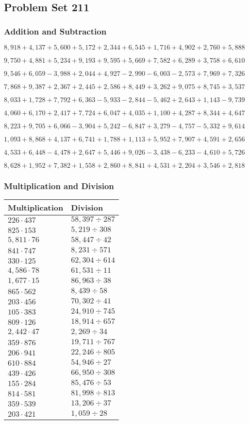 \hypertarget{problem-set-211}{%
\subsection{Problem Set 211}\label{problem-set-211}}

\hypertarget{addition-and-subtraction}{%
\subsubsection{Addition and
Subtraction}\label{addition-and-subtraction}}

\(8,918+4,137+5,600+5,172+2,344+6,545+1,716+4,902+2,760+5,888\)

\(9,750+4,881+5,234+9,193+9,595+5,669+7,582+6,289+3,758+6,610\)

\(9,546+6,059-3,988+2,044+4,927-2,990-6,003-2,573+7,969+7,326\)

\(7,868+9,387+2,367+2,445+2,586+8,449+3,262+9,075+8,745+3,537\)

\(8,033+1,728+7,792+6,363-5,933-2,844-5,462+2,643+1,143-9,739\)

\(4,060+6,170+2,417+7,724+6,047+4,035+1,100+4,287+8,344+4,647\)

\(8,223+9,705+6,066-3,904+5,242-6,847+3,279-4,757-5,332+9,614\)

\(1,093+8,868+4,137+6,741+1,788+1,113+5,952+7,907+4,591+2,656\)

\(4,533+6,448-4,478+2,647+5,446+9,026-3,438-6,233-4,610+5,726\)

\(8,628+1,952+7,382+1,558+2,860+8,841+4,531+2,204+3,546+2,818\)

\hypertarget{multiplication-and-division}{%
\subsubsection{Multiplication and
Division}\label{multiplication-and-division}}

\begin{longtable}[]{@{}ll@{}}
\toprule
Multiplication & Division\tabularnewline
\midrule
\endhead
\(226\cdot437\) & \(58,397÷287\)\tabularnewline
\(825\cdot153\) & \(5,219÷308\)\tabularnewline
\(5,811\cdot76\) & \(58,447÷42\)\tabularnewline
\(841\cdot747\) & \(8,231÷571\)\tabularnewline
\(330\cdot125\) & \(62,304÷614\)\tabularnewline
\(4,586\cdot78\) & \(61,531÷11\)\tabularnewline
\(1,677\cdot15\) & \(86,963÷38\)\tabularnewline
\(865\cdot562\) & \(8,439÷58\)\tabularnewline
\(203\cdot456\) & \(70,302÷41\)\tabularnewline
\(105\cdot383\) & \(24,910÷745\)\tabularnewline
\(809\cdot126\) & \(18,914÷657\)\tabularnewline
\(2,442\cdot47\) & \(2,269÷34\)\tabularnewline
\(359\cdot876\) & \(19,711÷767\)\tabularnewline
\(206\cdot941\) & \(22,246÷805\)\tabularnewline
\(610\cdot884\) & \(54,946÷27\)\tabularnewline
\(439\cdot426\) & \(66,950÷308\)\tabularnewline
\(155\cdot284\) & \(85,476÷53\)\tabularnewline
\(814\cdot581\) & \(81,998÷813\)\tabularnewline
\(359\cdot539\) & \(13,206÷37\)\tabularnewline
\(203\cdot421\) & \(1,059÷28\)\tabularnewline
\bottomrule
\end{longtable}
